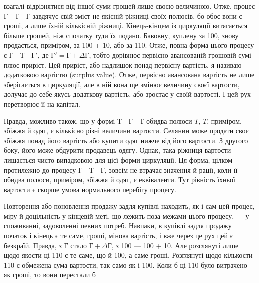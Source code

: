 взагалі відрізнятися від іншої суми грошей лише своєю величиною.
Отже, процес $Г — Т — Г$ завдячує свій зміст не якісній
ріжниці своїх полюсів, бо обоє вони є гроші, а лише їхній кількісній
ріжниці. Кінець-кінцем із циркуляції витягається більше
грошей, ніж спочатку туди їх подано. Бавовну, куплену за 100, знову продається, приміром, за 100 + 10, або за 110. Отже, повна форма
цього процесу є $Г — Т — Г'$, де $Г' = Г + ΔГ$, тобто дорівнює
первісно авансованій грошовій сумі плюс приріст. Цей приріст,
або надлишок понад первісну вартість, я називаю додатковою
вартістю (surplus value). Отже, первісно авансована вартість не
лише зберігається в циркуляції, але в ній вона ще змінює величину
своєї вартости, долучає до себе якусь додаткову вартість,
або зростає у своїй вартості. І цей рух перетворює її на
капітал.

Правда, можливо також, що у формі $Т — Г — Т$ обидва полюси
$T$, $T$, приміром, збіжжя й одяг, є кількісно різні величини
вартости. Селянин може продати своє збіжжя понад його вартість
або купити одяг нижче від його вартости. З другого боку, його
може обдурити продавець одягу. Однак, така ріжниця вартости
лишається чисто випадковою для цієї форми циркуляції. Ця форма,
цілком протилежно до процесу $Г — Т — Г$, зовсім не втрачає
значення й рації, коли її обидва полюси, приміром, збіжжя й
одяг, є еквіваленти. Тут рівність їхньої вартости є скорше умова
нормального перебігу процесу.

Повторення або поновлення продажу задля купівлі находить,
як і сам цей процес, міру й доцільність у кінцевій меті, що лежить
поза межами цього процесу, — у споживанні, задоволенні певних
потреб. Навпаки, в купівлі задля продажу початок і кінець
є те саме, гроші, мінова вартість, і вже через це рух цей є безкраїй.
Правда, з $Г$ стало $Г + ΔГ$, з 100 — 100 + 10. Але розглянуті лише щодо якости ці 110 є те саме, що й 100, а саме гроші.
Розглянуті щодо кількости 110 є обмежена сума
вартости, так само як і 100. Коли б ці 110 було витрачено як гроші, то вони перестали б
\parbreak{}  %
